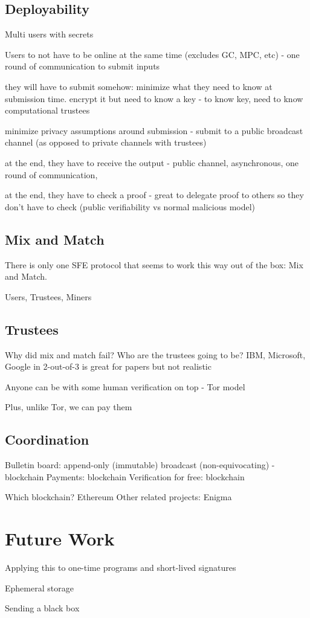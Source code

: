 \subsection{Deployability}

Multi users with secrets

Users to not have to be online at the same time (excludes GC, MPC, etc) - one round of communication to submit inputs

they will have to submit somehow: minimize what they need to know at submission time. encrypt it but need to know a key - to know key, need to know computational trustees

minimize privacy assumptions around submission - submit to a public broadcast channel (as opposed to private channels with trustees) 

at the end, they have to receive the output - public channel, asynchronous, one round of communication, 

at the end, they have to check a proof - great to delegate proof to others so they don't have to check (public verifiability vs normal malicious model)

\subsection{Mix and Match}

There is only one SFE protocol that seems to work this way out of the box: Mix and Match.

Users, Trustees, Miners

\subsection{Trustees}

Why did mix and match fail? Who are the trustees going to be? IBM, Microsoft, Google in 2-out-of-3 is great for papers but not realistic 

Anyone can be with some human verification on top - Tor model 

Plus, unlike Tor, we can pay them

\subsection{Coordination}

Bulletin board: append-only (immutable) broadcast (non-equivocating) - blockchain
Payments: blockchain
Verification for free: blockchain

Which blockchain? Ethereum
Other related projects: Enigma

\section{Future Work}

Applying this to one-time programs and short-lived signatures

Ephemeral storage

Sending a black box

 

